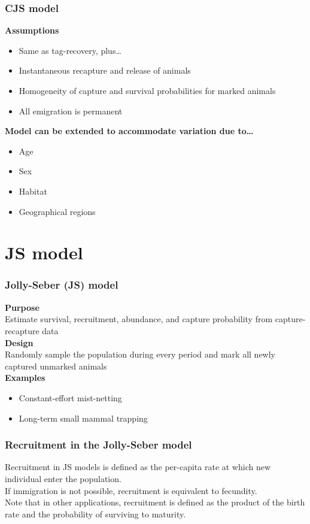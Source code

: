 \documentclass[color=usenames,dvipsnames]{beamer}\usepackage[]{graphicx}\usepackage[]{xcolor}
\begin{document}
\begin{frame}
  \frametitle{CJS model}
  {\bf Assumptions}
  \begin{itemize}
    \item Same as tag-recovery, plus\dots
    \item Instantaneous recapture and release of animals
    \item Homogeneity of capture and survival probabilities for marked
      animals
    \item All emigration is permanent
  \end{itemize}
  \pause
  \vspace{0.5cm}
  {\bf Model can be extended to accommodate variation due to\dots}
  \begin{itemize}
    \item Age
    \item Sex
    \item Habitat
    \item Geographical regions
  \end{itemize}

\end{frame}


\section{JS model}


\begin{frame}
  \frametitle{Jolly-Seber (JS) model}
  {\bf Purpose} \\
  Estimate survival, recruitment, abundance, and capture probability
  from capture-recapture data \\
  \pause
  \vspace{0.5cm}
  {\bf Design} \\
  Randomly sample the population during every period and mark all
  newly captured unmarked animals \\
  \pause
  \vspace{0.5cm}
  {\bf Examples}
  \begin{itemize}
    \item Constant-effort mist-netting
    \item Long-term small mammal trapping
  \end{itemize}
\end{frame}


\begin{frame}
  \frametitle{Recruitment in the Jolly-Seber model}
  Recruitment in JS models is defined as the per-capita rate at which
  new individual enter the population.  \\
  \vfill
  If immigration is not possible, recruitment is equivalent to
  fecundity. \\
  \vfill
  Note that in other applications, recruitment is defined as the
  product of the birth rate and the probability of surviving to maturity. \\
\end{frame}
\end{document}
